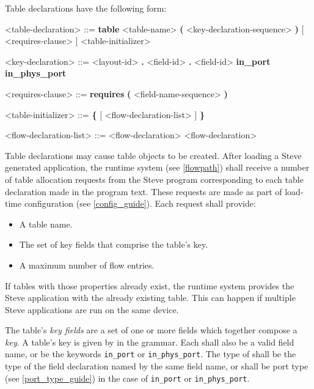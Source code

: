Table declarations have the following form:

\begin{minip}
\begin{grammar}
<table-declaration> ::=
\textbf{table} <table-name> \textbf{(} <key-declaration-sequence> \textbf{)}
[ <requires-clause> ] <table-initializer>

<key-declaration> ::=
<layout-id> \textbf{.} <field-id>
 \textbf{.} <field-id>
\alt \textbf{in\_port}
\alt \textbf{in\_phys\_port}

<requires-clause> ::=
\textbf{requires} \textbf{(} <field-name-sequence> \textbf{)}

<table-initializer> ::= \textbf{\{} [ <flow-declaration-list> ] \textbf{\}}

<flow-declaration-list> ::= <flow-declaration>
 <flow-declaration>
\end{grammar}
\end{minip}

Table declarations may cause table objects to be created. After loading a Steve generated application, the runtime system (see \ref{flowpath}) shall receive a number of table allocation requests from the Steve program corresponding to each table declaration made in the program text. These requests are made as part of load-time configuration (see \ref{config_guide}). Each request shall provide:

\begin{itemize}
\item A table name.
\item The set of key fields that comprise the table's key.
\item A maximum number of flow entries.
\end{itemize}

If tables with those properties already exist, the runtime system provides the Steve application with the already existing table. This can happen if multiple Steve applications are run on the same device.

The table's \textit{key fields} are a set of one or more fields which together compose a \textit{key}. A table's key is given by  in the grammar. Each  shall also be a valid field name, or be the keywords \texttt{in\_port} or \texttt{in\_phys\_port}. The type of  shall be the type of the field declaration named by the same field name, or shall be port type (see \ref{port_type_guide}) in the case of \texttt{in\_port} or \texttt{in\_phys\_port}.

